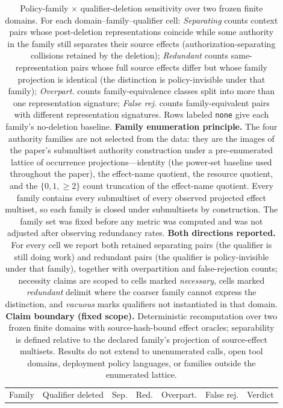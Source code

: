 \begin{table}[t]
\centering
\footnotesize
\setlength{\tabcolsep}{4pt}
\caption{Policy-family $\times$ qualifier-deletion sensitivity over two frozen
finite domains. For each domain--family--qualifier cell: \emph{Separating}
counts context pairs whose post-deletion representations coincide while some
authority in the family still separates their source effects
(authorization-separating collisions retained by the deletion);
\emph{Redundant} counts same-representation pairs whose full source effects
differ but whose family projection is identical (the distinction is
policy-invisible under that family); \emph{Overpart.} counts
family-equivalence classes split into more than one representation signature;
\emph{False rej.} counts family-equivalent pairs with different
representation signatures. Rows labeled \texttt{none} give each family's
no-deletion baseline. \textbf{Family enumeration principle.} The four
authority families are not selected from the data: they are the images of the
paper's submultiset authority construction under a pre-enumerated lattice of
occurrence projections---identity (the power-set baseline used throughout the
paper), the effect-name quotient, the resource quotient, and the
$\{0,1,\geq2\}$ count truncation of the effect-name quotient. Every family
contains every submultiset of every observed projected effect multiset, so
each family is closed under submultisets by construction. The family set was
fixed before any metric was computed and was not adjusted after observing
redundancy rates. \textbf{Both directions reported.} For every cell we report
both retained separating pairs (the qualifier is still doing work) and
redundant pairs (the qualifier is policy-invisible under that family),
together with overpartition and false-rejection counts; necessity claims are
scoped to cells marked \emph{necessary}, cells marked \emph{redundant}
delimit where the coarser family cannot express the distinction, and
\emph{vacuous} marks qualifiers not instantiated in that domain.
\textbf{Claim boundary (fixed scope).} Deterministic recomputation over two
frozen finite domains with source-hash-bound effect oracles; separability is
defined relative to the declared family's projection of source-effect
multisets. Results do not extend to unenumerated calls, open tool domains,
deployment policy languages, or families outside the enumerated lattice.}
\label{tab:policy-family-sensitivity}
\begin{tabular}{llrrrrl}
\toprule
Family & Qualifier deleted & Sep. & Red. & Overpart. & False rej. & Verdict \\

\end{tabular}
\end{table}
